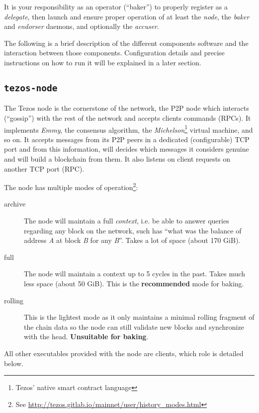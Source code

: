 \documentclass[a4paper,twocolumn,10pt]{article}
\begin{document}
It is your responsibility as an operator (“baker”) to properly
register as a \emph{delegate}, then launch and ensure proper operation
of at least the \emph{node}, the \emph{baker} and \emph{endorser}
daemons, and optionally the \emph{accuser}.

The following is a brief description of the different components
software and the interaction between those components. Configuration
details and precise instructions on how to run it will be explained in
a later section.

\subsection{\texttt{tezos-node}}

The Tezos node is the cornerstone of the network, the P2P node which
interacts (“gossip”) with the rest of the network and accepts clients
commands (RPCs). It implements \emph{Emmy}, the consensus algorithm,
the \emph{Michelson}\footnote{Tezos' native smart contract language}
virtual machine, and so on. It accepts messages from its P2P peers in
a dedicated (configurable) TCP port and from this information, will
decides which messages it considers genuine and will build a
blockchain from them. It also listens on client requests on another
TCP port (RPC).

The node has multiple modes of operation\footnote{See
  \url{http://tezos.gitlab.io/mainnet/user/history_modes.html}}:

\begin{description}
  \item[archive] The node will maintain a full \emph{context}, i.e. be
    able to answer queries regarding any block on the network, such
    has “what was the balance of address \emph{A} at block \emph{B}
    for any \emph{B}”. Takes a lot of space (about 170 GiB).
   \item[full] The node will maintain a context up to 5 cycles in the
     past. Takes much less space (about 50 GiB). This is the
     \textbf{recommended} mode for baking.
    \item[rolling] This is the lightest mode as it only maintains a
      minimal rolling fragment of the chain data so the node can still
      validate new blocks and synchronize with the
      head. \textbf{Unsuitable for baking}.
\end{description}

All other executables provided with the node are
clients, which role is detailed below.
\end{document}
